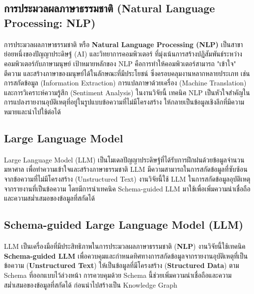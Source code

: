 \subsection{การประมวลผลภาษาธรรมชาติ (Natural Language Processing: NLP)}\label{sec:NLP}
\paragraph{}
การประมวลผลภาษาธรรมชาติ หรือ \textbf{Natural Language Processing (NLP)} เป็นสาขาย่อยหนึ่งของปัญญาประดิษฐ์ (AI) และวิทยาการคอมพิวเตอร์ ที่มุ่งเน้นการสร้างปฏิสัมพันธ์ระหว่างคอมพิวเตอร์กับภาษามนุษย์ เป้าหมายหลักของ NLP คือการทำให้คอมพิวเตอร์สามารถ "เข้าใจ" ตีความ และสร้างภาษาของมนุษย์ได้ในลักษณะที่มีประโยชน์ ซึ่งครอบคลุมงานหลากหลายประเภท เช่น การสกัดข้อมูล (Information Extraction) การแปลภาษาด้วยเครื่อง (Machine Translation) และการวิเคราะห์ความรู้สึก (Sentiment Analysis) ในงานวิจัยนี้ เทคนิค NLP เป็นหัวใจสำคัญในการแปลงรายงานอุบัติเหตุที่อยู่ในรูปแบบข้อความที่ไม่มีโครงสร้าง ให้กลายเป็นข้อมูลเชิงลึกที่มีความหมายและนำไปใช้ต่อได้

\subsection{Large Language Model}
\paragraph{}
Large Language Model (LLM) เป็นโมเดลปัญญาประดิษฐ์ที่ได้รับการฝึกฝนด้วยข้อมูลจำนวนมหาศาล เพื่อทำความเข้าใจและสร้างภาษาธรรมชาติ LLM มีความสามารถในการสกัดข้อมูลที่ซับซ้อนจากข้อความที่ไม่มีโครงสร้าง (Unstructured Text) งานวิจัยนี้ใช้ LLM ในการสกัดข้อมูลอุบัติเหตุจากรายงานที่เป็นข้อความ โดยมีการนำเทคนิค Schema-guided LLM มาใช้เพื่อเพิ่มความน่าเชื่อถือและความสม่ำเสมอของข้อมูลที่สกัดได้

\subsection{Schema-guided Large Language Model (LLM)}\label{sec:sgLLM}
\paragraph{}
LLM เป็นเครื่องมือที่มีประสิทธิภาพในการประมวลผลภาษาธรรมชาติ (\textbf{NLP}) \cite{khot2024prompting} งานวิจัยนี้ใช้เทคนิค \textbf{Schema-guided LLM} เพื่อควบคุมและกำหนดทิศทางการสกัดข้อมูลจากรายงานอุบัติเหตุที่เป็นข้อความ (\textbf{Unstructured Text}) ให้เป็นข้อมูลที่มีโครงสร้าง (\textbf{Structured Data}) ตาม Schema ที่ออกแบบไว้ล่วงหน้า \cite{liyan2022analysis} การควบคุมด้วย Schema นี้ช่วยเพิ่มความน่าเชื่อถือและความสม่ำเสมอของข้อมูลที่สกัดได้ ก่อนนำไปสร้างเป็น Knowledge Graph \cite{liyan2022analysis}

